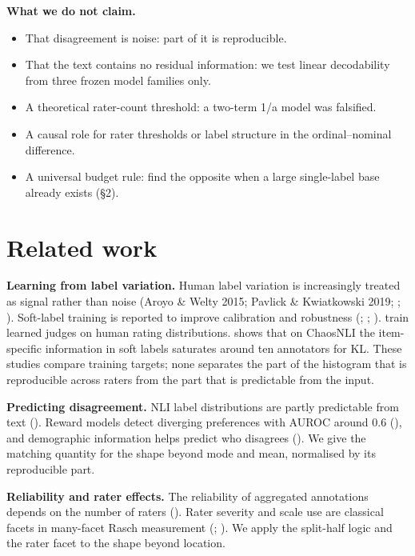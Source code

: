 \documentclass[10pt,twocolumn]{article}
\providecommand{\tightlist}{\setlength{\itemsep}{0pt}\setlength{\parskip}{0pt}}
\begin{document}
\textbf{What we do not claim.}

\begin{itemize}
\tightlist
\item
  That disagreement is noise: part of it is reproducible.
\item
  That the text contains no residual information: we test linear decodability from three frozen model families only.
\item
  A theoretical rater-count threshold: a two-term 1/a model was falsified.
\item
  A causal role for rater thresholds or label structure in the ordinal--nominal difference.
\item
  A universal budget rule: \citet{zhang2021learning} find the opposite when a large single-label base already exists (\S{}2).
\end{itemize}

\section{Related work}

\textbf{Learning from label variation.} Human label variation is increasingly treated as signal rather than noise (Aroyo \& Welty 2015; Pavlick \& Kwiatkowski 2019; \citealp{uma2021learning}; \citealp{plank2022problem}). Soft-label training is reported to improve calibration and robustness (\citealp{peterson2019human}; \citealp{collins2022eliciting}; \citealp{singh2025distributions}). \citet{chen2025beyond} train learned judges on human rating distributions. \citet{kohli2026metric} shows that on ChaosNLI the item-specific information in soft labels saturates around ten annotators for KL. These studies compare training targets; none separates the part of the histogram that is reproducible across raters from the part that is predictable from the input.

\textbf{Predicting disagreement.} NLI label distributions are partly predictable from text (\citealp{zhou2022distributed}). Reward models detect diverging preferences with AUROC around 0.6 (\citealp{zhang2025diverging}), and demographic information helps predict who disagrees (\citealp{wan2023everyone}). We give the matching quantity for the shape beyond mode and mean, normalised by its reproducible part.

\textbf{Reliability and rater effects.} The reliability of aggregated annotations depends on the number of raters (\citealp{wong2022krater}). Rater severity and scale use are classical facets in many-facet Rasch measurement (\citealp{linacre1989mfrm}; \citealp{eckes2011mfrm}). We apply the split-half logic and the rater facet to the shape beyond location.
\end{document}

